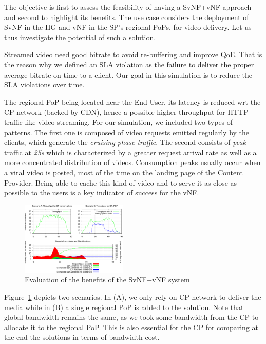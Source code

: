 The objective is first to assess the feasibility of having a SvNF+vNF approach and second to highlight its benefits. 
The use case considers the deployment of SvNF in the HG and vNF in the SP's regional PoPs, for video delivery.
Let us thus investigate the potential of such a solution.

Streamed video need good bitrate to avoid re-buffering and improve QoE. That is the reason why we defined an SLA violation as the failure to deliver the proper average bitrate on time to a client. Our goal in this simulation is to reduce the SLA violations over time.

The regional PoP being located near the End-User, its latency is reduced wrt the CP network (backed by CDN), hence a possible higher throughput for HTTP traffic like video streaming.
For our simulation, we included two types of patterns. 
The first one is composed of video requests emitted regularly by the clients, which generate the \textit{cruising phase traffic}. 
The second consists of \textit{peak} traffic at \textit{25s} which is characterized by a greater request arrival rate as well as a more concentrated distribution of videos.
Consumption peaks usually occur when a viral video is posted, most of the time on the landing page of the Content Provider.
Being able to cache this kind of video and to serve it as close as possible to the users is a key indicator of success for the vNF.
\begin{figure}
  \begin{center}
    \includegraphics[width=0.45\textwidth]{fig/CP+POP_evaluation.pdf}
  \end{center}
  \caption{ Evaluation of the benefits of the SvNF+vNF system
    \label{fig:cppopeval}
  }
\end{figure}	

Figure~\ref{fig:cppopeval} depicts two scenarios. In (A), we only rely on CP network to deliver the media while in (B) a single regional PoP is added to the solution. 
Note that global bandwidth remains the same, as we took some bandwidth from the CP to allocate it to the regional PoP.
This is also essential for the CP for comparing at the end the solutions in terms of bandwidth cost.

